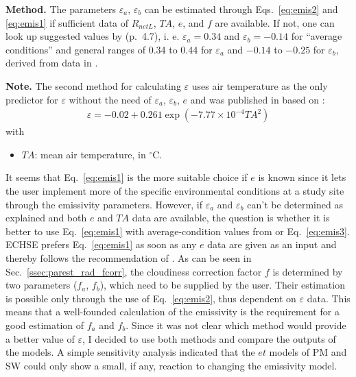 \documentclass{scrreprt}
\newenvironment{denseitem}{
  \begin{itemize}
    \setlength{\itemsep}{0pt}
    \setlength{\parskip}{0pt}
    \setlength{\parsep}{0pt}
}{
  \end{itemize}
}
\begin{document}
\noindent
\textbf{Method.}
The parameters $\varepsilon_a$, $\varepsilon_b$ can be estimated through Eqs.~\eqref{eq:emis2} and \eqref{eq:emis1} if sufficient data of $R_{netL}$, $TA$, $e$, and $f$ are available.
If not, one can look up suggested values by \citet{maidment93} (p.~4.7), i. e. $\varepsilon_a = 0.34$ and $\varepsilon_b = -0.14$ for ``average conditions'' and general ranges of 0.34 to 0.44 for $\varepsilon_a$ and $-0.14$ to $-0.25$ for $\varepsilon_b$, derived from data in \citet{fao77}.

\noindent
\textbf{Note.}
The second method for calculating $\varepsilon$ uses air temperature as the only predictor for $\varepsilon$ without the need of $\varepsilon_a$, $\varepsilon_b$, $e$ and was published in \citet{maidment93} based on \citet{idso69}:
\begin{align} \label{eq:emis3}
  \varepsilon = -0.02 + 0.261 \exp(-7.77 \times 10^{-4} TA^2)
\end{align}
%
with
\begin{denseitem}
  \item[] $TA$: mean air temperature, in $^\circ$C.
\end{denseitem}
%
It seems that Eq.~\eqref{eq:emis1} is the more suitable choice if $e$ is known since it lets the user implement more of the specific environmental conditions at a study site through the emissivity parameters.
However, if $\varepsilon_a$ and $\varepsilon_b$ can't be determined as explained and both $e$ and $TA$ data are available, the question is whether it is better to use Eq.~\eqref{eq:emis1} with average-condition values from \citet{maidment93} or Eq.~\eqref{eq:emis3}.
ECHSE prefers Eq.~\eqref{eq:emis1} as soon as any $e$ data are given as an input and thereby follows the recommendation of \citet{maidment93}.
As can be seen in Sec.~\ref{ssec:parest_rad_fcorr}, the cloudiness correction factor $f$ is determined by two parameters ($f_a$, $f_b$), which need to be supplied by the user.
Their estimation is possible only through the use of Eq.~\eqref{eq:emis2}, thus dependent on $\varepsilon$ data.
This means that a well-founded calculation of the emissivity is the requirement for a good estimation of $f_a$ and $f_b$.
Since it was not clear which method would provide a better value of $\varepsilon$, I decided to use both methods and compare the outputs of the models.
A simple sensitivity analysis indicated that the $et$ models of PM and SW could only show a small, if any, reaction to changing the emissivity model.
\end{document}
